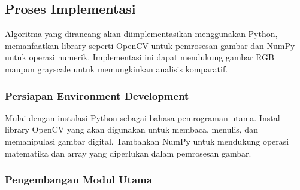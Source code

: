 \documentclass{ittelkom}
\begin{document}
\subsection{Proses Implementasi}

Algoritma yang dirancang akan diimplementasikan menggunakan Python,
memanfaatkan library seperti OpenCV untuk pemrosesan gambar dan NumPy untuk
operasi numerik. Implementasi ini dapat mendukung gambar RGB maupun grayscale
untuk memungkinkan analisis komparatif.

\subsubsection{Persiapan Environment Development}

Mulai dengan instalasi Python sebagai bahasa pemrograman utama. Instal library
OpenCV yang akan digunakan untuk membaca, menulis, dan memanipulasi gambar
digital. Tambahkan NumPy untuk mendukung operasi matematika dan array yang
diperlukan dalam pemrosesan gambar.

\subsubsection{Pengembangan Modul Utama}
\end{document}
